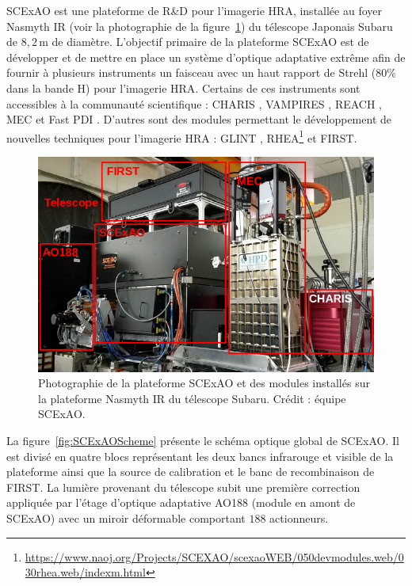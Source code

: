 \acrfull{SCExAO} \citep{jovanovic2015} est une plateforme de R\&D pour l'imagerie \ac{HRA}, installée au foyer Nasmyth IR (voir la photographie de la figure~\ref{fig:SCExAOPhoto}) du télescope Japonais Subaru de $8,2 \,$m de diamètre. L'objectif primaire de la plateforme \ac{SCExAO} est de développer et de mettre en place un système d'optique adaptative extrême afin de fournir à plusieurs instruments un faisceau avec un haut rapport de Strehl ($80 \%$ dans la bande H) pour l'imagerie \ac{HRA}. Certains de ces instruments sont accessibles à la communauté scientifique : \acrfull{CHARIS} \citep{groff2015}, \acrfull{VAMPIRES} \citep{norris2015}, \ac{REACH} \citep{kotani2018}, \ac{MEC} \citep{walter2020} et Fast \ac{PDI} \citep{lozi2020}. D'autres sont des modules permettant le développement de nouvelles techniques pour l'imagerie \ac{HRA} : \ac{GLINT} \citep{norris2020b}, \ac{RHEA}\footnote{\url{https://www.naoj.org/Projects/SCEXAO/scexaoWEB/050devmodules.web/030rhea.web/indexm.html}} et \ac{FIRST}.

\begin{figure}[ht!]
    \centering
    \includegraphics[width=\figwidth]{Figure_Chap5/SCExAO_onNasIR_label.png}
    \caption[Photographie de la plateforme SCExAO et des modules installés sur la plateforme Nasmyth IR du télescope Subaru.]{Photographie de la plateforme SCExAO et des modules installés sur la plateforme Nasmyth IR du télescope Subaru. Crédit : équipe SCExAO.}
    \label{fig:SCExAOPhoto}
\end{figure}

La figure~\ref{fig:SCExAOScheme} présente le schéma optique global de \ac{SCExAO}. Il est divisé en quatre blocs représentant les deux bancs infrarouge et visible de la plateforme ainsi que la source de calibration et le banc de recombinaison de \ac{FIRST}. La lumière provenant du télescope subit une première correction appliquée par l'étage d'optique adaptative AO188 \citep{minowa2010} (module en amont de \ac{SCExAO}) avec un miroir déformable comportant $188$ actionneurs.

